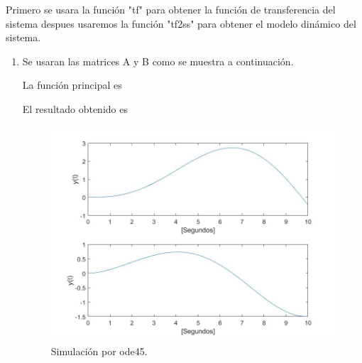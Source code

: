 \documentclass[12pt]{article}
\begin{document}
\begin{enumerate}
    
        
    Primero se usara la función "tf" para obtener la función de transferencia del sistema despues usaremos la función "tf2ss" para obtener el modelo dinámico del sistema.
    \begin{enumerate}
        \item Se usaran las matrices A y B como se muestra a continuación.
        
        
        
        La función principal es
        

        El resultado obtenido es

        \begin{figure}[h]
            \centering
            \includegraphics[width=13cm,height=8cm]{IMAGENES/9.jpg}
            \caption{Simulación por ode45.}
        \end{figure}
        

\end{enumerate}
\end{enumerate}
\end{document}
